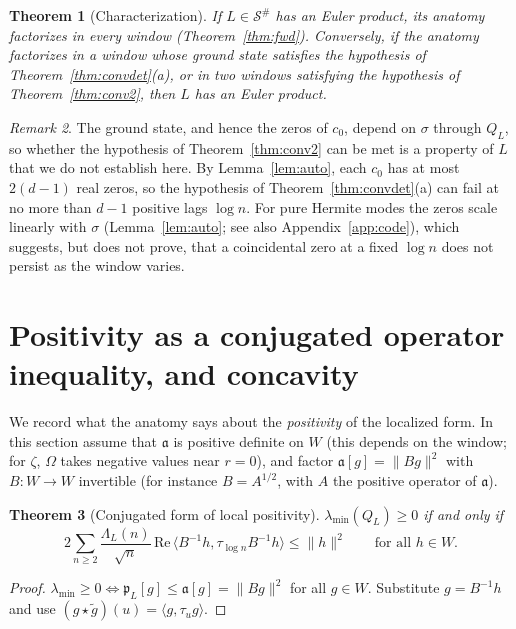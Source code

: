 \documentclass[11pt]{amsart}
\newtheorem{theorem}{Theorem}[section]
\theoremstyle{definition}
\theoremstyle{remark}
\newtheorem{remark}[theorem]{Remark}
\newcommand{\fa}{\mathfrak a}
\newcommand{\fp}{\mathfrak p}
\newcommand{\cS}{\mathcal S}
\begin{document}
\begin{theorem}[Characterization]\label{thm:char}
If $L\in\cS^\#$ has an Euler product, its anatomy factorizes in every window
(Theorem~\ref{thm:fwd}). Conversely, if the anatomy factorizes in a window whose
ground state satisfies the hypothesis of Theorem~\ref{thm:convdet}\textup{(a)},
or in two windows satisfying the hypothesis of Theorem~\ref{thm:conv2}, then $L$
has an Euler product.
\end{theorem}

\begin{remark}
The ground state, and hence the zeros of $c_0$, depend on $\sigma$ through $Q_L$,
so whether the hypothesis of Theorem~\ref{thm:conv2} can be met is a property of
$L$ that we do not establish here. By Lemma~\ref{lem:auto}, each $c_0$ has at
most $2(d-1)$ real zeros, so the hypothesis of Theorem~\ref{thm:convdet}(a) can
fail at no more than $d-1$ positive lags $\log n$. For pure Hermite modes the
zeros scale linearly with $\sigma$ (Lemma~\ref{lem:auto}; see also
Appendix~\ref{app:code}), which suggests, but does not prove, that a
coincidental zero at a fixed $\log n$ does not persist as the window varies.
\end{remark}

\section{\texorpdfstring{Positivity as a conjugated operator inequality, and concavity}{Positivity as a conjugated operator inequality, and concavity}}
\label{sec:carleson}

We record what the anatomy says about the \emph{positivity} of the localized
form. In this section assume that $\fa$ is positive definite on $W$ (this
depends on the window; for $\zeta$, $\Omega$ takes negative values near $r=0$), and
factor $\fa[g]=\|Bg\|^2$ with $B\colon W\to W$ invertible (for instance
$B=A^{1/2}$, with $A$ the positive operator of $\fa$).

\begin{theorem}[Conjugated form of local positivity]\label{thm:carleson}
$\lambda_{\min}(Q_L)\ge0$ if and only if
\[
2\sum_{n\ge2}\frac{\Lambda_L(n)}{\sqrt n}\,\mathrm{Re}\,\langle B^{-1}h,\tau_{\log n}
B^{-1}h\rangle\le\|h\|^2\qquad\text{for all }h\in W.
\]
\end{theorem}
\begin{proof}
$\lambda_{\min}\ge0\iff\fp_L[g]\le\fa[g]=\|Bg\|^2$ for all $g\in W$. Substitute
$g=B^{-1}h$ and use $(g\star\tilde g)(u)=\langle g,\tau_ug\rangle$.
\end{proof}
\end{document}

